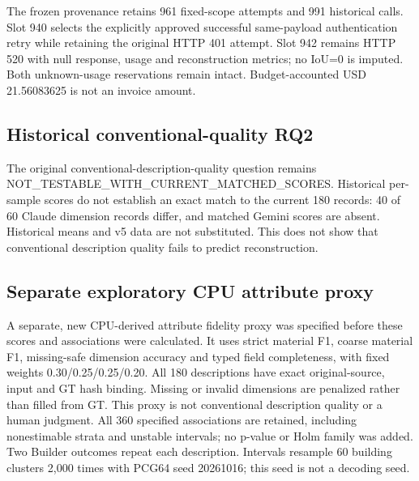The frozen provenance retains 961 fixed-scope attempts and 991 historical calls. Slot 940 selects the explicitly approved successful same-payload authentication retry while retaining the original HTTP 401 attempt. Slot 942 remains HTTP 520 with null response, usage and reconstruction metrics; no IoU=0 is imputed. Both unknown-usage reservations remain intact. Budget-accounted USD 21.56083625 is not an invoice amount.

\subsection{Historical conventional-quality RQ2}

The original conventional-description-quality question remains NOT\_TESTABLE\_WITH\_CURRENT\_MATCHED\_SCORES. Historical per-sample scores do not establish an exact match to the current 180 records: 40 of 60 Claude dimension records differ, and matched Gemini scores are absent. Historical means and v5 data are not substituted. This does not show that conventional description quality fails to predict reconstruction.

\subsection{Separate exploratory CPU attribute proxy}

A separate, new CPU-derived attribute fidelity proxy was specified before these scores and associations were calculated. It uses strict material F1, coarse material F1, missing-safe dimension accuracy and typed field completeness, with fixed weights 0.30/0.25/0.25/0.20. All 180 descriptions have exact original-source, input and GT hash binding. Missing or invalid dimensions are penalized rather than filled from GT. This proxy is not conventional description quality or a human judgment. All 360 specified associations are retained, including nonestimable strata and unstable intervals; no p-value or Holm family was added. Two Builder outcomes repeat each description. Intervals resample 60 building clusters 2,000 times with PCG64 seed 20261016; this seed is not a decoding seed.

